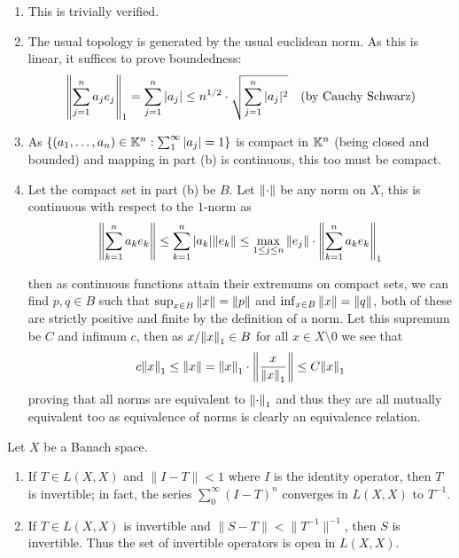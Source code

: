 \documentclass[12pt,a4paper]{article}
\begin{document}
\begin{solution}
\begin{enumerate}[label=\alph*.]
    \item This is trivially verified. 
    \item The usual topology is generated by the usual euclidean norm. 
        As this is linear, it suffices to prove boundedness: 
        \[
            \norm{\sum_{j=1}^na_je_j}_1=\sum_{j=1}^n|a_j|\leq n^{1/2}\cdot\sqrt{\sum_{j=1}^n|a_j|^2}\quad\text{(by Cauchy Schwarz)}
        \] 
    \item As $ \qty{(a_1,\ldots,a_n)\in\mathbb{K}^n :\sum_1^\infty|a_j|=1}$ is compact in $\mathbb{K}^n$ (being closed and bounded) and mapping in part (b) is continuous, this too must be compact.  
    \item Let the compact set in part (b) be $B.$ 
        Let $\norm{\cdot}$ be any norm on $X$, this is continuous with respect to the $1$-norm as 
        \[
            \norm{\sum_{k=1}^na_ke_k}\leq\sum_{k=1}^n|a_k|\|e_k\|\leq\max_{1\leq j\leq n}\|e_j\|\cdot\norm{\sum_{k=1}^na_ke_k}_1
        \]
        
        then as continuous functions attain their extremums on compact sets, we can find $p,q\in B$ such that $\sup_{x\in B}\norm{x}=\norm{p}$ and $\inf_{x\in B} \norm{x}= \norm{q}$, both of these are strictly positive and finite by the definition of a norm. 
        Let this supremum be $C$ and infimum $c$, then as $x/ \norm{x}_1\in B$ for all $x\in X\setminus \qty{0}$ we see that
        \[
            c \norm{x}_1\leq\norm{x}= \norm{x}_1\cdot \norm{ \frac{x}{ \norm{x}_1}}\leq C \norm{x}_1
        \]
        proving that all norms are equivalent to $\norm{\cdot}_1$ and thus they are all mutually equivalent too as equivalence of norms is clearly an equivalence relation. 
\end{enumerate}
\end{solution}
\begin{problem}\label{prob:5-7}
Let $X$ be a Banach space.
\begin{enumerate}[label=\alph*.]
\item If $T \in L(X,X)$ and $\|I-T\| < 1$ where $I$ is the identity operator, then $T$ is invertible; in fact, the series $\sum_{0}^{\infty} (I-T)^n$ converges in $L(X,X)$ to $T^{-1}$.
\item If $T \in L(X,X)$ is invertible and $\|S-T\| < \|T^{-1}\|^{-1}$, then $S$ is invertible. Thus the set of invertible operators is open in $L(X,X)$.
\end{enumerate}
\end{problem}
\end{document}
